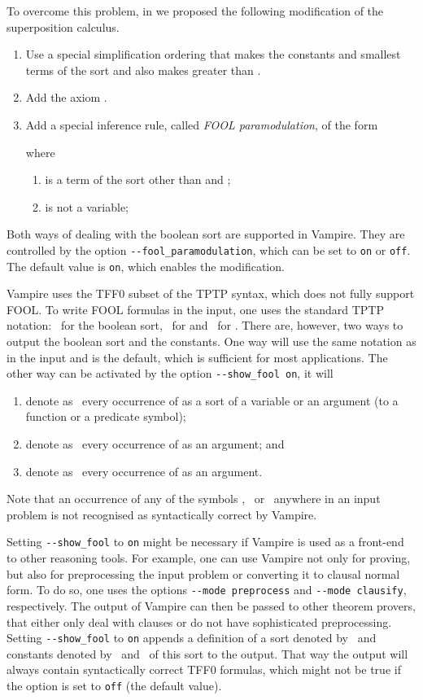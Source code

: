 To overcome this problem, in \cite{FOOL} we proposed the following modification of the superposition calculus.
\begin{enumerate}
  \item Use a special simplification ordering that makes the constants  and  smallest terms of the sort  and also makes  greater than .

\item Add the axiom .

\item Add a special inference rule, called \emph{FOOL paramodulation}, of the form
  
where
\begin{enumerate}
\item  is a term of the sort  other than  and ;
\item  is not a variable;
\end{enumerate}
\end{enumerate}

Both ways of dealing with the boolean sort are supported in Vampire. They are controlled by the option \verb|--fool_paramodulation|, which can be set to \verb|on| or \verb|off|. The default value is \verb|on|, which enables the modification.

Vampire uses the TFF0 subset of the TPTP syntax, which does not fully support FOOL. To write FOOL formulas in the input, one uses the standard TPTP notation: \tptpo\ for the boolean sort, \dtrue\ for  and \dfalse\ for . There are, however, two ways to output the boolean sort and the constants. One way will use the same notation as in the input and is the default, which is sufficient for most applications. The other way can be activated by the option \verb'--show_fool on', it will
\begin{enumerate}
  \item denote as \dbool\ every occurrence of  as a sort of a variable or an argument (to a function or a predicate symbol);
  \item denote as \ddtrue\ every occurrence of  as an argument; and
  \item denote as \ddfalse\ every occurrence of  as an argument.
\end{enumerate}
Note that an occurrence of any of the symbols \dbool, \ddtrue\ or \ddfalse\ anywhere in an input problem is not recognised as syntactically correct by Vampire.

Setting \verb'--show_fool' to \verb'on' might be necessary if Vampire is used as a front-end to other reasoning tools. For example, one can use Vampire not only for proving, but also for preprocessing the input problem or converting it to clausal normal form. To do so, one uses the options \verb|--mode preprocess| and \verb|--mode clausify|, respectively. The output of Vampire can then be passed to other theorem provers, that either only deal with clauses or do not have sophisticated preprocessing. Setting \verb'--show_fool' to \verb'on' appends a definition of a sort denoted by \dbool\ and constants denoted by \ddtrue\ and \ddfalse\ of this sort to the output. That way the output will always contain syntactically correct TFF0 formulas, which might not be true if the option is set to \verb'off' (the default value).

